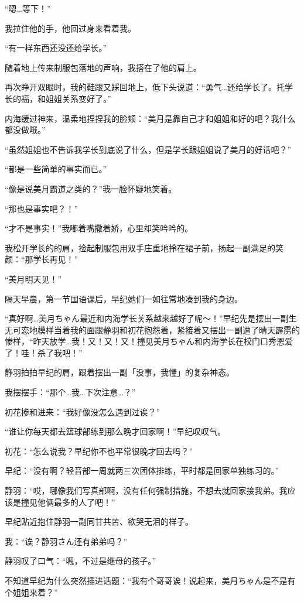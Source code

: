 “嗯…等下！”

我拉住他的手，他回过身来看着我。

“有一样东西还没还给学长。”

随着地上传来制服包落地的声响，我搭在了他的肩上。

再次睁开双眼时，我的鞋跟又踩回地上，低下头说道：“勇气…还给学长了。托学长的福，和姐姐关系变好了。”

内海缓过神来，温柔地捏捏我的脸颊：“美月是靠自己才和姐姐和好的吧？我什么都没做哦。”

“虽然姐姐也不告诉我学长到底说了什么，但是学长跟姐姐说了美月的好话吧？”

“都是一些简单的事实而已。”

“像是说美月霸道之类的？”我一脸怀疑地笑着。

“那也是事实吧？！”

“才不是事实！”我嘟着嘴撒着娇，心里却笑吟吟的。

我松开学长的的肩，捡起制服包用双手庄重地拎在裙子前，扬起一副满足的笑颜：“那学长再见！”

“美月明天见！”


\newday{\cloudy}

隔天早晨，第一节国语课后，早纪她们一如往常地凑到我的身边。

“真好啊…美月ちゃん最近和内海学长关系越来越好了呢～！”早纪先是摆出一副生无可恋地模样当着我的面跟静羽和初花抱怨着，紧接着又摆出一副遭了晴天霹雳的惨样，“昨天放学…我！又！又！又！撞见美月ちゃん和内海学长在校门口秀恩爱了！哇！杀了我吧！”

静羽拍拍早纪的肩，跟着摆出一副「没事，我懂」的复杂神态。

我摆摆手：“那个…我…下次注意…？”

初花掺和进来：“我好像没怎么遇到过诶？”

“谁让你每天都去篮球部练到那么晚才回家啊！”早纪叹叹气。

初花：“怎么说我？早纪你不也平常很晚才回去吗？”

早纪：“没有啊？轻音部一周就两三次团体排练，平时都是回家单独练习的。”

静羽：“哎，哪像我们写真部啊，没有任何强制措施，不想去就回家接我弟。我应该是撞见他俩最多的人了吧！”

早纪贴近抱住静羽一副同甘共苦、欲哭无泪的样子。

我：“诶？静羽さん还有弟弟吗？”

静羽叹了口气：“嗯，不过是继母的孩子。”

不知道早纪为什么突然插进话题：“我有个哥哥诶！说起来，美月ちゃん是不是有个姐姐来着？”

